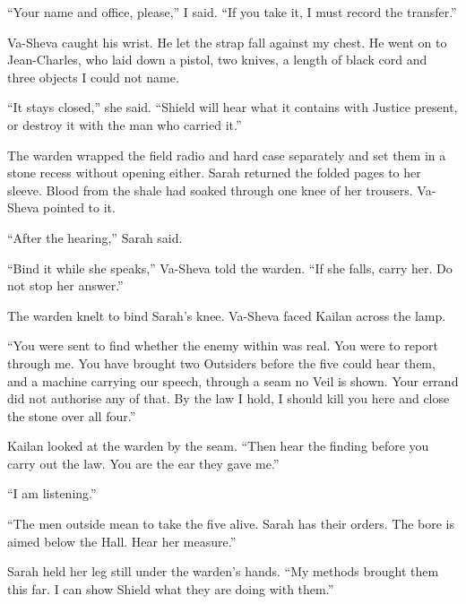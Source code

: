 ``Your name and office, please,'' I said. ``If you take it, I must record the transfer.''\par

Va-Sheva caught his wrist. He let the strap fall against my chest. He went on to Jean-Charles, who laid down a pistol, two knives, a length of black cord and three objects I could not name.\par

``It stays closed,'' she said. ``Shield will hear what it contains with Justice present, or destroy it with the man who carried it.''\par

The warden wrapped the field radio and hard case separately and set them in a stone recess without opening either. Sarah returned the folded pages to her sleeve. Blood from the shale had soaked through one knee of her trousers. Va-Sheva pointed to it.\par

``After the hearing,'' Sarah said.\par

``Bind it while she speaks,'' Va-Sheva told the warden. ``If she falls, carry her. Do not stop her answer.''\par

The warden knelt to bind Sarah's knee. Va-Sheva faced Kailan across the lamp.\par

``You were sent to find whether the enemy within was real. You were to report through me. You have brought two Outsiders before the five could hear them, and a machine carrying our speech, through a seam no Veil is shown. Your errand did not authorise any of that. By the law I hold, I should kill you here and close the stone over all four.''\par

Kailan looked at the warden by the seam. ``Then hear the finding before you carry out the law. You are the ear they gave me.''\par

``I am listening.''\par

``The men outside mean to take the five alive. Sarah has their orders. The bore is aimed below the Hall. Hear her measure.''\par

Sarah held her leg still under the warden's hands. ``My methods brought them this far. I can show Shield what they are doing with them.''\par

